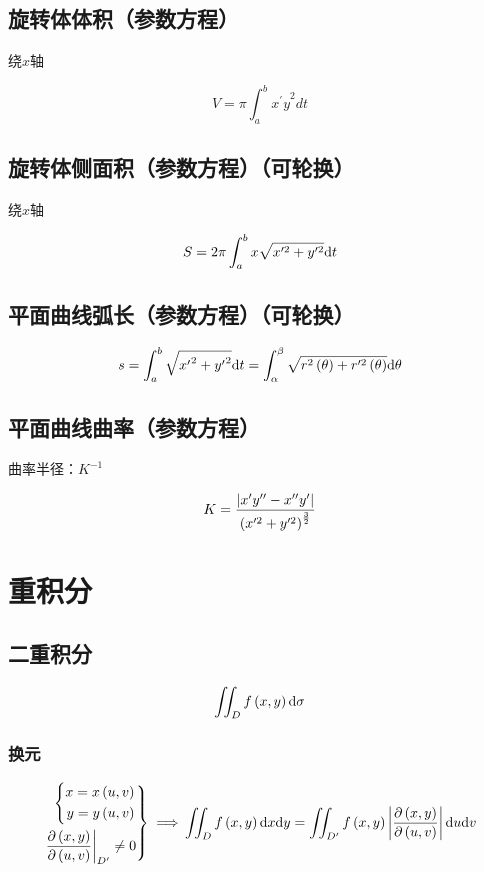 \documentclass{article}
\begin{document}
\subsection{旋转体体积（参数方程）}

绕$x$轴

\[V=\pi\int_a^b{{x^\prime y}^2dt}\]

\subsection{旋转体侧面积（参数方程）（可轮换）}

绕$x$轴

\[S=2\pi\int_a^b{x\sqrt{x^{\prime2}+y^{\prime2}}\mathrm d t}\]

\subsection{平面曲线弧长（参数方程）（可轮换）}

\[s=\int_a^b{\sqrt{{x^\prime}^2+{y^\prime}^2}\mathrm d t}=\int_{\alpha}^{\beta}{\sqrt{r^2\left(\theta\right)+r^{\prime2}\left(\theta\right)}\mathrm d\theta}\]

\subsection{平面曲线曲率（参数方程）}

曲率半径：$K^{-1}$

\[K=\frac{\left|x^\prime y^{\prime\prime}-x^{\prime\prime}y^\prime\right|}{\left(x^{\prime2}+y^{\prime2}\right)^\frac32}\]

\section{重积分}

\subsection{二重积分}

\begin{definition}[$\d\sigma=\d x\d y$]
    \[\iint_Df\left(x,y\right)\mathrm d\sigma\]
\end{definition}

\subsubsection{换元}

\[\left.\begin{aligned}
        \left\{\begin{aligned}
                   x=x\left(u,v\right) \\
                   y=y\left(u,v\right)
               \end{aligned}\right. \\
        \left.\frac{\partial\left(x,y\right)}{\partial\left(u,v\right)}\right|_{D^\prime}\neq0
    \end{aligned}\right\}\implies\\
    \iint_Df\left(x,y\right)\mathrm d x\mathrm d y=
    \iint_{D^\prime}f\left(x,y\right)\left|\frac{\partial\left(x,y\right)}{\partial\left(u,v\right)}\right|\mathrm d u\mathrm d v\]
\end{document}
